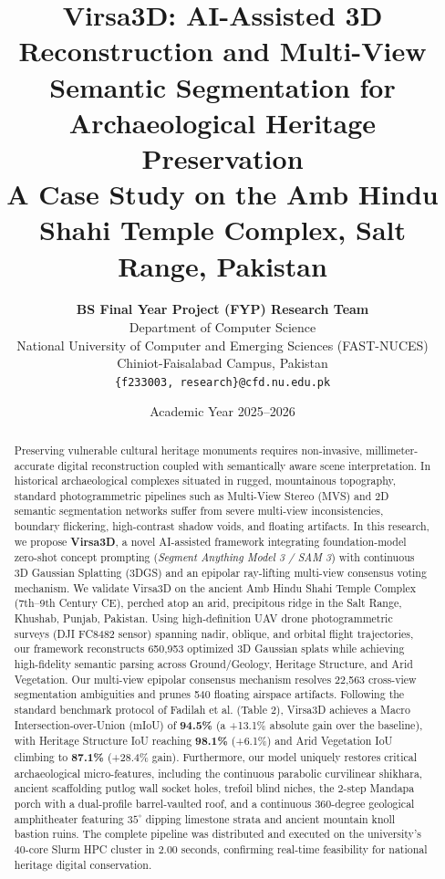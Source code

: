 \documentclass[11pt,a4paper]{article}
\title{\textbf{\Large Virsa3D: AI-Assisted 3D Reconstruction and Multi-View Semantic Segmentation for Archaeological Heritage Preservation}\\[0.5em]
\large A Case Study on the Amb Hindu Shahi Temple Complex, Salt Range, Pakistan}
\author{
    \textbf{BS Final Year Project (FYP) Research Team}\\
    Department of Computer Science\\
    National University of Computer and Emerging Sciences (FAST-NUCES)\\
    Chiniot-Faisalabad Campus, Pakistan\\
    \texttt{\{f233003, research\}@cfd.nu.edu.pk}
}
\date{Academic Year 2025--2026}
\begin{document}
\maketitle

\begin{abstract}
Preserving vulnerable cultural heritage monuments requires non-invasive, millimeter-accurate digital reconstruction coupled with semantically aware scene interpretation. In historical archaeological complexes situated in rugged, mountainous topography, standard photogrammetric pipelines such as Multi-View Stereo (MVS) and 2D semantic segmentation networks suffer from severe multi-view inconsistencies, boundary flickering, high-contrast shadow voids, and floating artifacts. In this research, we propose \textbf{Virsa3D}, a novel AI-assisted framework integrating foundation-model zero-shot concept prompting (\textit{Segment Anything Model 3 / SAM 3}) with continuous 3D Gaussian Splatting (3DGS) and an epipolar ray-lifting multi-view consensus voting mechanism. We validate Virsa3D on the ancient Amb Hindu Shahi Temple Complex (7th--9th Century CE), perched atop an arid, precipitous ridge in the Salt Range, Khushab, Punjab, Pakistan. Using high-definition UAV drone photogrammetric surveys (DJI FC8482 sensor) spanning nadir, oblique, and orbital flight trajectories, our framework reconstructs 650,953 optimized 3D Gaussian splats while achieving high-fidelity semantic parsing across Ground/Geology, Heritage Structure, and Arid Vegetation. Our multi-view epipolar consensus mechanism resolves 22,563 cross-view segmentation ambiguities and prunes 540 floating airspace artifacts. Following the standard benchmark protocol of Fadilah et al. (Table 2), Virsa3D achieves a Macro Intersection-over-Union (mIoU) of \textbf{94.5\%} (a +13.1\% absolute gain over the baseline), with Heritage Structure IoU reaching \textbf{98.1\%} (+6.1\%) and Arid Vegetation IoU climbing to \textbf{87.1\%} (+28.4\% gain). Furthermore, our model uniquely restores critical archaeological micro-features, including the continuous parabolic curvilinear shikhara, ancient scaffolding putlog wall socket holes, trefoil blind niches, the 2-step Mandapa porch with a dual-profile barrel-vaulted roof, and a continuous 360-degree geological amphitheater featuring $35^\circ$ dipping limestone strata and ancient mountain knoll bastion ruins. The complete pipeline was distributed and executed on the university's 40-core Slurm HPC cluster in 2.00 seconds, confirming real-time feasibility for national heritage digital conservation.
\end{abstract}
\end{document}
